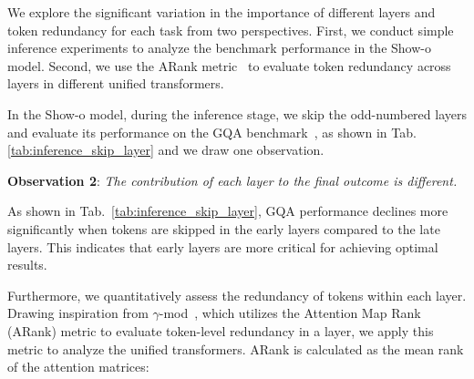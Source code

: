 We explore the significant variation in the importance of different layers and token redundancy for each task from two perspectives. First, we conduct simple inference experiments to analyze the benchmark performance in the Show-o model. Second, we use the ARank metric~\cite{gamma-mod} to evaluate token redundancy across layers in different unified transformers.



In the Show-o model, during the inference stage, we skip the odd-numbered layers and evaluate its performance on the GQA benchmark~\cite{gqa}, as shown in Tab.\ref{tab:inference_skip_layer} and we draw one observation.



\textbf{Observation 2}: \textit{The contribution of each layer to the final outcome is different.}

As shown in Tab.~\ref{tab:inference_skip_layer}, GQA performance declines more significantly when tokens are skipped in the early layers compared to the late layers. This indicates that early layers are more critical for achieving optimal results.

Furthermore, we quantitatively assess the redundancy of tokens within each layer. Drawing inspiration from $\gamma$-mod~\cite{gamma-mod}, which utilizes the Attention Map Rank (ARank) metric to evaluate token-level redundancy in a layer, we apply this metric to analyze the unified transformers. ARank is calculated as the mean rank of the attention matrices:

